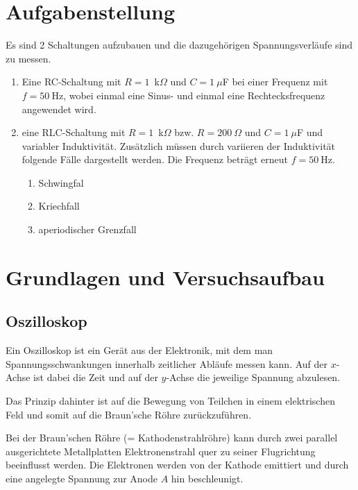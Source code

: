 \documentclass{article}
\begin{document}
\parindent0cm




\pagestyle{fancy}

\section{Aufgabenstellung}

Es sind 2 Schaltungen aufzubauen und die dazugehörigen Spannungsverläufe sind zu messen.

\begin{enumerate}
\item Eine RC-Schaltung mit $R=1$~k$\Omega$ und $C=1~\mu$F bei  einer Frequenz mit $f=50~$Hz, wobei einmal eine Sinus- und einmal eine Rechtecksfrequenz angewendet wird.

\item eine RLC-Schaltung mit $R=1$~k$\Omega$ bzw. $R=200~\Omega$ und $C=1~\mu$F und variabler Induktivität. Zusätzlich müssen durch variieren der Induktivität folgende Fälle dargestellt werden. Die Frequenz beträgt erneut $f=50~$Hz.
\begin{enumerate}
\item Schwingfal
\item Kriechfall
\item aperiodischer Grenzfall
\end{enumerate}
\end{enumerate}




\section{Grundlagen und Versuchsaufbau}

\subsection{Oszilloskop}

Ein Oszilloskop ist ein Gerät aus der Elektronik, mit dem man Spannungsschwankungen innerhalb zeitlicher Abläufe messen kann. Auf der $x$-Achse ist dabei die Zeit und auf der $y$-Achse die jeweilige Spannung abzulesen.

Das Prinzip dahinter ist auf die Bewegung von Teilchen in einem elektrischen Feld und somit auf die Braun'sche Röhre zurückzuführen.

Bei der Braun'schen Röhre (= Kathodenstrahlröhre) kann durch zwei parallel ausgerichtete Metallplatten Elektronenstrahl quer zu seiner Flugrichtung beeinflusst werden. Die Elektronen werden von der Kathode emittiert und durch eine angelegte Spannung zur Anode $A$ hin beschleunigt.
\end{document}
